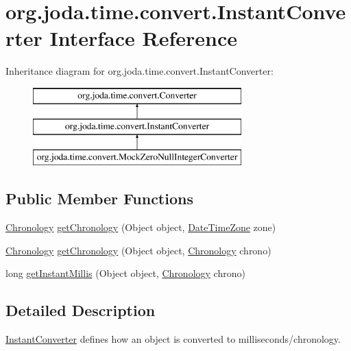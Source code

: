 \hypertarget{interfaceorg_1_1joda_1_1time_1_1convert_1_1_instant_converter}{\section{org.\-joda.\-time.\-convert.\-Instant\-Converter Interface Reference}
\label{interfaceorg_1_1joda_1_1time_1_1convert_1_1_instant_converter}
}
Inheritance diagram for org.\-joda.\-time.\-convert.\-Instant\-Converter\-:\begin{figure}[H]
\begin{center}
\leavevmode
\includegraphics[height=3.000000cm]{interfaceorg_1_1joda_1_1time_1_1convert_1_1_instant_converter}
\end{center}
\end{figure}
\subsection*{Public Member Functions}
\begin{DoxyCompactItemize}
\item 
\hyperlink{classorg_1_1joda_1_1time_1_1_chronology}{Chronology} \hyperlink{interfaceorg_1_1joda_1_1time_1_1convert_1_1_instant_converter_a4070f222767465465d18e7b8dc7ffb58}{get\-Chronology} (Object object, \hyperlink{classorg_1_1joda_1_1time_1_1_date_time_zone}{Date\-Time\-Zone} zone)
\item 
\hyperlink{classorg_1_1joda_1_1time_1_1_chronology}{Chronology} \hyperlink{interfaceorg_1_1joda_1_1time_1_1convert_1_1_instant_converter_a3866f391bac594795d4836d7f2577e87}{get\-Chronology} (Object object, \hyperlink{classorg_1_1joda_1_1time_1_1_chronology}{Chronology} chrono)
\item 
long \hyperlink{interfaceorg_1_1joda_1_1time_1_1convert_1_1_instant_converter_ad110f18c0d261a5c3bc6801e214db09e}{get\-Instant\-Millis} (Object object, \hyperlink{classorg_1_1joda_1_1time_1_1_chronology}{Chronology} chrono)
\end{DoxyCompactItemize}


\subsection{Detailed Description}
\hyperlink{interfaceorg_1_1joda_1_1time_1_1convert_1_1_instant_converter}{Instant\-Converter} defines how an object is converted to milliseconds/chronology. 

